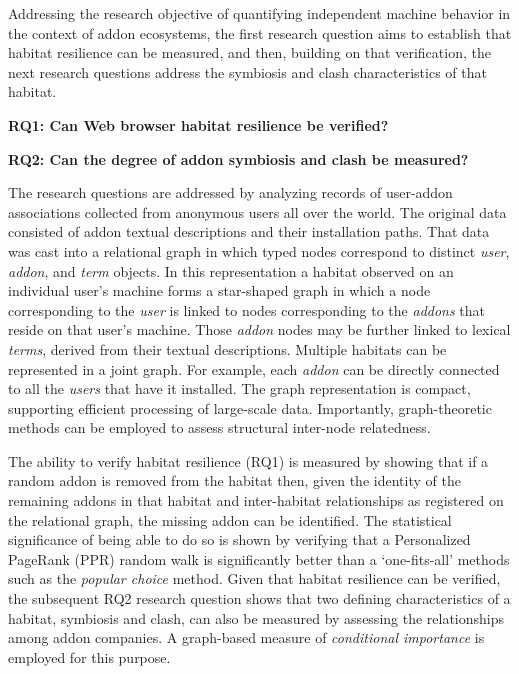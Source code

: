 \documentclass[10pt,letterpaper]{article}
\begin{document}
Addressing the research objective of quantifying independent machine behavior in the context of addon ecosystems, the first research question aims to establish that habitat resilience can be measured, and then, building on that verification, the next research questions address the symbiosis and clash characteristics of that habitat. 


\noindent \textbf{RQ1: Can Web browser habitat resilience be verified?}

\noindent \textbf{RQ2: Can the degree of addon symbiosis and clash be measured?}

The research questions are addressed by analyzing records of user-addon associations collected from anonymous users all over the world. The original data consisted of addon textual descriptions and their installation paths. That data was cast into a relational graph in which typed nodes correspond to distinct \textit{user}, \textit{addon}, and \textit{term} objects. In this representation a habitat observed on an individual user's machine forms a star-shaped graph in which a node corresponding to the \textit{user} is linked to nodes corresponding to the \textit{addons} that reside on that user's machine. Those \textit{addon} nodes may be further linked to lexical\textit{ terms}, derived from their textual descriptions. Multiple habitats can be represented in a joint graph. For example, each \textit{addon} can be directly connected to all the \textit{users} that have it installed. The graph representation is compact, supporting efficient processing of large-scale data. Importantly, graph-theoretic methods can be employed to assess structural inter-node relatedness.

The ability to verify habitat resilience (RQ1) is measured by showing that if a random addon is removed from the habitat then, given the identity of the remaining addons in that habitat and inter-habitat relationships as registered on the relational graph, the missing addon can be identified. The statistical significance of being able to do so is shown by verifying that a Personalized PageRank (PPR) random walk is significantly better than a `one-fits-all' methods such as the \textit{popular choice} method. Given that habitat resilience can be verified, the subsequent RQ2 research question shows that two defining characteristics of a habitat, symbiosis and clash, can also be measured by assessing the relationships among addon companies. A graph-based measure of \textit{conditional importance} is employed for this purpose.
\end{document}
